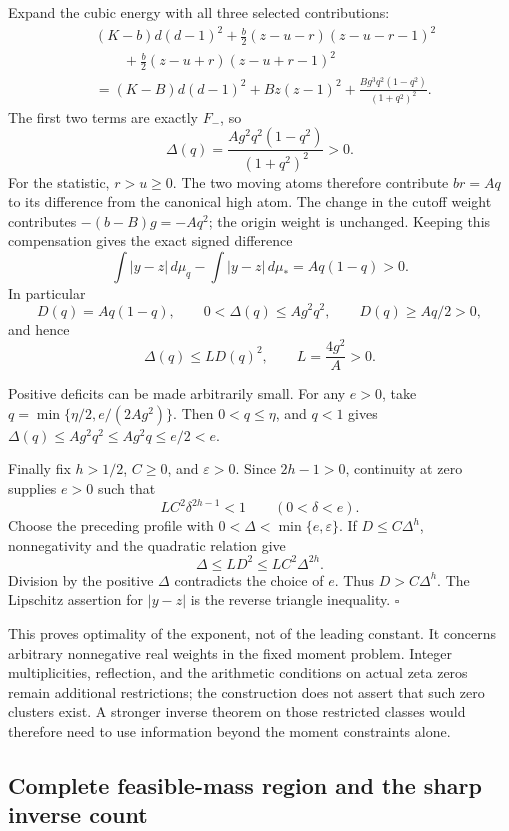 Expand the cubic energy with all three selected contributions:
\[
\begin{split}
 &(K-b)d(d-1)^2
 +\frac b2(z-u-r)(z-u-r-1)^2\\
 &\qquad+\frac b2(z-u+r)(z-u+r-1)^2\\
 &=(K-B)d(d-1)^2+Bz(z-1)^2
   +\frac{Bg^3q^2(1-q^2)}{(1+q^2)^2}.
\end{split}
\]
The first two terms are exactly \(F_-\), so
\[
 \Delta(q)=\frac{Ag^2q^2(1-q^2)}{(1+q^2)^2}>0.
\]
For the statistic, \(r>u\ge0\).  The two moving atoms therefore
contribute \(br=Aq\) to its difference from the canonical high atom.
The change in the cutoff weight contributes
\(-(b-B)g=-Aq^2\); the origin weight is unchanged.
Keeping this compensation gives the exact signed difference
\[
 \int|y-z|\,d\mu_q-\int|y-z|\,d\mu_*
       =Aq(1-q)>0.
\]
In particular
\[
 D(q)=Aq(1-q),\qquad
 0<\Delta(q)\le Ag^2q^2,\qquad D(q)\ge Aq/2>0,
\]
and hence
\[
 \Delta(q)\le L D(q)^2,\qquad L=\frac{4g^2}{A}>0.
\]

Positive deficits can be made arbitrarily small.  For any \(e>0\),
take \(q=\min\{\eta/2,e/(2Ag^2)\}\).
Then \(0<q\le\eta\), and \(q<1\) gives
\(\Delta(q)\le Ag^2q^2\le Ag^2q\le e/2<e\).

Finally fix \(h>1/2\), \(C\ge0\), and \(\varepsilon>0\).
Since \(2h-1>0\), continuity at zero supplies \(e>0\) such that
\[
 LC^2\delta^{2h-1}<1\qquad(0<\delta<e).
\]
Choose the preceding profile with
\(0<\Delta<\min\{e,\varepsilon\}\).
If \(D\le C\Delta^h\), nonnegativity and the quadratic relation give
\[
 \Delta\le LD^2\le LC^2\Delta^{2h}.
\]
Division by the positive \(\Delta\) contradicts the choice of \(e\).
Thus \(D>C\Delta^h\).
The Lipschitz assertion for \(|y-z|\) is the reverse triangle inequality.
\hfill\(\square\)

This proves optimality of the exponent, not of the leading constant.
It concerns arbitrary nonnegative real weights in the fixed moment
problem.  Integer multiplicities, reflection, and the arithmetic
conditions on actual zeta zeros remain additional restrictions;
the construction does not assert that such zero clusters exist.
A stronger inverse theorem on those restricted classes would therefore
need to use information beyond the moment constraints alone.

\subsection{Complete feasible-mass region and the sharp inverse count}

